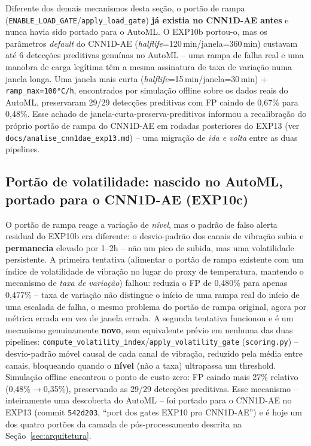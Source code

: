 \documentclass[11pt,a4paper]{article}
\begin{document}
Diferente dos demais mecanismos desta seção, o portão de rampa
(\texttt{ENABLE\_LOAD\_GATE}/\texttt{apply\_load\_gate}) \textbf{já
existia no CNN1D-AE antes} e nunca havia sido portado para o AutoML.
O EXP10b portou-o, mas os parâmetros \emph{default} do CNN1D-AE
(\emph{halflife}=120\,min/janela=360\,min) custavam até 6 detecções
preditivas genuínas no AutoML -- uma rampa de falha real e uma manobra
de carga legítima têm a mesma assinatura de taxa de variação numa
janela longa. Uma janela mais curta
(\emph{halflife}=15\,min/janela=30\,min) + \texttt{ramp\_max=100°C/h},
encontrados por simulação offline sobre os dados reais do AutoML,
preservaram 29/29 detecções preditivas com FP caindo de 0,67\% para
0,48\%. Esse achado de janela-curta-preserva-preditivos informou a
recalibração do próprio portão de rampa do CNN1D-AE em rodadas
posteriores do EXP13 (ver \texttt{docs/analise\_cnn1dae\_exp13.md}) --
uma migração de \emph{ida e volta} entre as duas pipelines.

\subsection{Portão de volatilidade: nascido no AutoML, portado para o CNN1D-AE (EXP10c)}
\label{sec:volgate-migracao}

O portão de rampa reage a variação de \emph{nível}, mas o padrão de
falso alerta residual do EXP10b era diferente: o desvio-padrão dos
canais de vibração subia e \textbf{permanecia} elevado por 1--2h -- não
um pico de subida, mas uma volatilidade persistente. A primeira
tentativa (alimentar o portão de rampa existente com um índice de
volatilidade de vibração no lugar do proxy de temperatura, mantendo o
mecanismo de \emph{taxa de variação}) falhou: reduzia o FP de 0,480\%
para apenas 0,477\% -- taxa de variação não distingue o início de uma
rampa real do início de uma escalada de falha, o mesmo problema do
portão de rampa original, agora por métrica errada em vez de janela
errada. A segunda tentativa funcionou e é um mecanismo genuinamente
\textbf{novo}, sem equivalente prévio em nenhuma das duas pipelines:
\texttt{compute\_volatility\_index}/\texttt{apply\_volatility\_gate}
(\texttt{scoring.py}) -- desvio-padrão móvel causal de cada canal de
vibração, reduzido pela média entre canais, bloqueando quando o
\textbf{nível} (não a taxa) ultrapassa um threshold. Simulação offline
encontrou o ponto de custo zero: FP caindo mais 27\% relativo
(0,48\%$\to$0,35\%), preservando as 29/29 detecções preditivas. Esse
mecanismo -- inteiramente uma descoberta do AutoML -- foi portado para
o CNN1D-AE no EXP13 (commit \texttt{542d203}, ``port dos gates EXP10
pro CNN1D-AE'') e é hoje um dos quatro portões da camada de
pós-processamento descrita na Seção~\ref{sec:arquitetura}.
\end{document}
